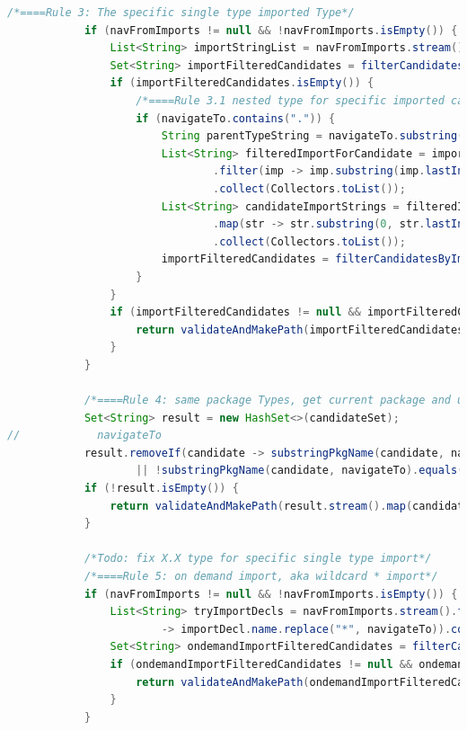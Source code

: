 \documentclass[runningheads]{llncs}
\begin{document}
\begin{lstlisting}[language=Java, caption=Main navigation algorithm]
            /*====Rule 3: The specific single type imported Type*/
            if (navFromImports != null && !navFromImports.isEmpty()) {
                List<String> importStringList = navFromImports.stream().map(importDecl -> importDecl.name).collect(Collectors.toList());
                Set<String> importFilteredCandidates = filterCandidatesByImports(candidateSet, importStringList);
                if (importFilteredCandidates.isEmpty()) {
                    /*====Rule 3.1 nested type for specific imported case*/
                    if (navigateTo.contains(".")) {
                        String parentTypeString = navigateTo.substring(0, navigateTo.indexOf("."));
                        List<String> filteredImportForCandidate = importStringList.stream()
                                .filter(imp -> imp.substring(imp.lastIndexOf(".") + 1, imp.length()).equals(parentTypeString))
                                .collect(Collectors.toList());
                        List<String> candidateImportStrings = filteredImportForCandidate.stream()
                                .map(str -> str.substring(0, str.lastIndexOf(".")) + "." + navigateTo)
                                .collect(Collectors.toList());
                        importFilteredCandidates = filterCandidatesByImports(candidateSet, candidateImportStrings);
                    }
                }
                if (importFilteredCandidates != null && importFilteredCandidates.size() != 0) {
                    return validateAndMakePath(importFilteredCandidates.stream().map(candidate -> new GavCu(candidate)), navigateTo);
                }
            }

            /*====Rule 4: same package Types, get current package and use it to filter the index candidates*/
            Set<String> result = new HashSet<>(candidateSet);
//            navigateTo
            result.removeIf(candidate -> substringPkgName(candidate, navigateTo) == null
                    || !substringPkgName(candidate, navigateTo).equals(navFromPkg));
            if (!result.isEmpty()) {
                return validateAndMakePath(result.stream().map(candidate -> new GavCu(candidate)), navigateTo);
            }

            /*Todo: fix X.X type for specific single type import*/
            /*====Rule 5: on demand import, aka wildcard * import*/
            if (navFromImports != null && !navFromImports.isEmpty()) {
                List<String> tryImportDecls = navFromImports.stream().filter(importDecl -> importDecl.name.contains("*")).map(importDecl
                        -> importDecl.name.replace("*", navigateTo)).collect(Collectors.toList());
                Set<String> ondemandImportFilteredCandidates = filterCandidatesByImports(candidateSet, tryImportDecls);
                if (ondemandImportFilteredCandidates != null && ondemandImportFilteredCandidates.size() > 0) {
                    return validateAndMakePath(ondemandImportFilteredCandidates.stream().map(candidate -> new GavCu(candidate)), null);
                }
            }


\end{lstlisting}
\end{document}
